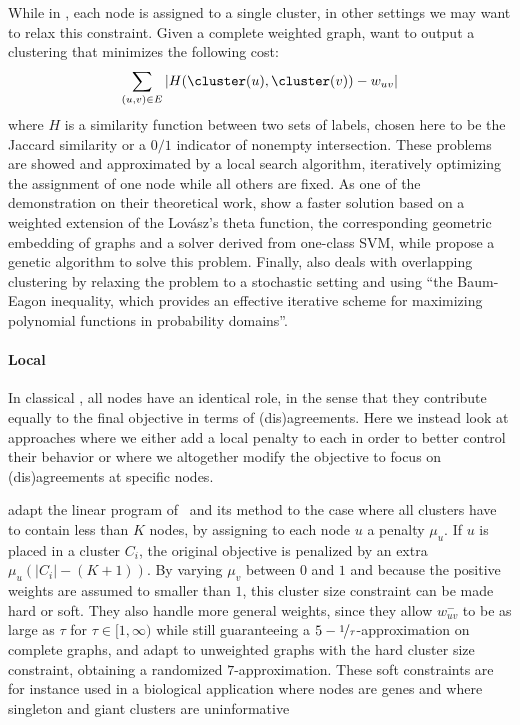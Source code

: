 While in \pcc{}, each node is assigned to a single cluster, in other settings we may want to relax
this constraint. Given a complete weighted graph, \textcite{Bonchi2012} want to output a clustering
\cluster{} that minimizes the following cost: \[ \sum_{(u,v)\in E} \left| H(\cluster(u),
\cluster(v)) - w_{uv}\right|\] where $H$ is a similarity function between two sets of labels, chosen
here to be the Jaccard similarity or a $0/1$ indicator of nonempty intersection. These problems are
showed \NPc{} and approximated by a local search algorithm, iteratively optimizing the assignment of
one node while all others are fixed. As one of the demonstration on their theoretical work,
\textcite{WeightedTheta15} show a faster solution based on a weighted extension of the Lovász's
theta function, the corresponding geometric embedding of graphs and a solver derived from one-class
SVM, while \textcite{GeneticOCC14} propose a genetic algorithm to solve this problem. Finally,
\Textcite{StochasticCC13} also deals with overlapping clustering by relaxing the problem to a
stochastic setting and using \enquote{the Baum-Eagon inequality, which provides an effective
iterative scheme for maximizing polynomial functions in probability domains}.

\paragraph{Local \pcc{}}

In classical \pcc{}, all nodes have an identical role, in the sense that they contribute equally to
the final objective in terms of (dis)agreements. Here we instead look at approaches where we either
add a local penalty to each in order to better control their behavior or where we altogether modify
the objective to focus on (dis)agreements at specific nodes.

\Textcite{Puleo2014} adapt the linear program of~\autocite{Charikar2003} and its \regionGrow{}
method to the case
where all clusters have to contain less than $K$ nodes, by assigning to each node $u$ a penalty
$\mu_u$. If $u$ is placed in a cluster $C_i$, the original \mind{} objective is penalized by an
extra $\mu_u\left(|C_i| - (K+1)\right)$. By varying $\mu_v$ between $0$ and $1$ and because the
positive weights are assumed to smaller than $1$, this cluster size constraint can be made hard or
soft. They also handle more general weights, since they allow $w^-_{uv}$ to be as large as $\tau$
for $\tau\in [1,\infty)$ while still guaranteeing a $5-\nicefrac{1}{\tau}$-approximation on complete
graphs, and adapt \ccpivot{} to unweighted graphs with the hard cluster size constraint, obtaining a
randomized $7$-approximation.
These soft constraints are for instance used in a biological application where nodes are genes and
where singleton and giant clusters are uninformative~\autocite{Hou2016}

